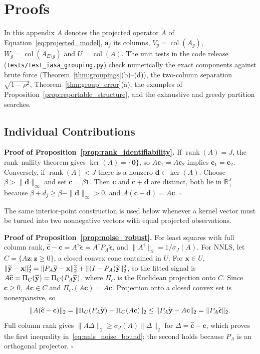 \section{Proofs}
\label{app:identifiability_proofs}

In this appendix \(A\) denotes the projected operator \(\widetilde A\) of
Equation~\ref{eq:projected_model}, \(\mathbf a_j\) its columns,
\(V_g=\operatorname{col}(A_g)\), \(W_g=\operatorname{col}(A_{E\setminus g})\) and
\(U=\operatorname{col}(A)\).  The unit tests in the code release
(\texttt{tests/test\_iasa\_grouping.py}) check numerically the exact components against
brute force (Theorem~\ref{thm:groupings}(b)--(d)), the two-column separation
\(\sqrt{1-\rho^2}\), Theorem~\ref{thm:group_error}(a), the examples of
Proposition~\ref{prop:reportable_structure}, and the exhaustive and greedy partition
searches.

\subsection{Individual Contributions}

\noindent\textbf{Proof of Proposition~\ref{prop:rank_identifiability}.}
If \(\operatorname{rank}(A)=J\), the rank--nullity theorem gives
\(\ker(A)=\{\mathbf 0\}\), so \(A\mathbf c_1=A\mathbf c_2\) implies
\(\mathbf c_1=\mathbf c_2\).  Conversely, if \(\operatorname{rank}(A)<J\) there is a
nonzero \(\mathbf d\in\ker(A)\).  Choose \(\beta>\|\mathbf d\|_\infty\) and set
\(\mathbf c=\beta\mathbf 1\).  Then \(\mathbf c\) and \(\mathbf c+\mathbf d\) are
distinct, both lie in \(\mathbb R_+^J\) because
\(\beta+d_j\ge\beta-\|\mathbf d\|_\infty>0\), and
\(A(\mathbf c+\mathbf d)=A\mathbf c\).  \(\square\)

The same interior-point construction is used below whenever a kernel vector must be
turned into two nonnegative vectors with equal projected observations.

\noindent\textbf{Proof of Proposition~\ref{prop:noise_robust}.}
For least squares with full column rank,
\(\widehat{\mathbf c}-\mathbf c=A^\dagger\widetilde{\boldsymbol\epsilon}
=A^\dagger P_A\widetilde{\boldsymbol\epsilon}\), and
\(\|A^\dagger\|_2=1/\sigma_J(A)\).  For NNLS, let
\(C=\{A\mathbf z:\mathbf z\ge0\}\), a closed convex cone contained in \(U\).  For
\(\mathbf x\in U\),
\(\|\widetilde{\mathbf y}-\mathbf x\|_2^2=\|P_A\widetilde{\mathbf y}-\mathbf x\|_2^2+\|(I-P_A)\widetilde{\mathbf y}\|_2^2\), so the
fitted signal is \(A\widehat{\mathbf c}=\Pi_C(\widetilde{\mathbf y})=\Pi_C(P_A\widetilde{\mathbf y})\), where \(\Pi_C\) is
the Euclidean projection onto \(C\).  Since \(\mathbf c\ge0\), \(A\mathbf c\in C\)
and \(\Pi_C(A\mathbf c)=A\mathbf c\).  Projection onto a closed convex set is
nonexpansive, so
\[
\|A(\widehat{\mathbf c}-\mathbf c)\|_2
=\|\Pi_C(P_A\widetilde{\mathbf y})-\Pi_C(A\mathbf c)\|_2
\le\|P_A\widetilde{\mathbf y}-A\mathbf c\|_2
=\|P_A\widetilde{\boldsymbol\epsilon}\|_2 .
\]
Full column rank gives \(\|A\Delta\|_2\ge\sigma_J(A)\|\Delta\|_2\) for
\(\Delta=\widehat{\mathbf c}-\mathbf c\), which proves the first inequality
in~\eqref{eq:nnls_noise_bound}; the second holds because \(P_A\) is an orthogonal
projector.  \(\square\)

